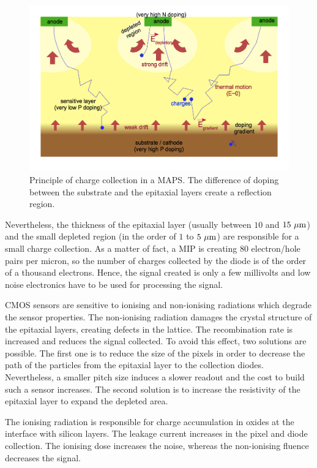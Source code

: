    \begin{figure}[!tbh]
      \centering
      \includegraphics[width = \textwidth]{Pictures/vxd/collectionEfield.png}
      \caption{Principle of charge collection in a MAPS. The difference of doping between the substrate and the epitaxial layers create a reflection region.}
      \label{fig:collectionEfield}
    \end{figure}

    Nevertheless, the thickness of the epitaxial layer (usually between $10$ and $15~\rm{\mu m}$) and the small depleted region (in the order of $1$ to $5~\rm{\mu m}$) are responsible for a small charge collection.
    As a matter of fact, a \gls{MIP} is creating 80 electron/hole pairs per micron, so the number of charges collected by the diode is of the order of a thousand electrons.
    Hence, the signal created is only a few millivolts and low noise electronics have to be used for processing the signal.

    \gls{CMOS} sensors are sensitive to ionising and non-ionising radiations which degrade the sensor properties.
    The non-ionising radiation damages the crystal structure of the epitaxial layers, creating defects in the lattice.
    The recombination rate is increased and reduces the signal collected.
    To avoid this effect, two solutions are possible.
    The first one is to reduce the size of the pixels in order to decrease the path of the particles from the epitaxial layer to the collection diodes.
    Nevertheless, a smaller pitch size induces a slower readout and the cost to build such a sensor increases.
    The second solution is to increase the resistivity of the epitaxial layer to expand the depleted area.
    
    The ionising radiation is responsible for charge accumulation in oxides at the interface with silicon layers.
    The leakage current increases in the pixel and diode collection.
    The ionising dose increases the noise, whereas the non-ionising fluence decreases the signal.
    

